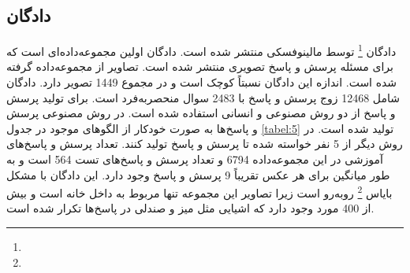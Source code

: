 \subsection{ دادگان }
	دادگان
	\footnote{}\cite{malinowski2014multi}
	توسط مالینوفسکی منتشر ‌شده ‌است. دادگان 
اولین مجموعه‌داده‌ای است که برای مسئله پرسش و پاسخ تصویری منتشر ‌شده ‌است. تصاویر از مجموعه‌داده
  \cite{silberman2012indoor}
   گرفته ‌شده ‌است.  اندازه این دادگان نسبتاً کوچک است و در مجموع 1449 تصویر دارد. دادگان
 شامل 12468 زوج پرسش و پاسخ با 2483 سوال منحصربه‌فرد است. برای تولید پرسش و پاسخ‌ از دو روش مصنوعی و انسانی استفاده ‌شده ‌است. در روش مصنوعی پرسش و پاسخ‌ها به صورت خودکار از الگوهای موجود در جدول
 \ref{tabel:5}
  تولید ‌شده ‌است. در روش دیگر از 5 نفر خواسته ‌شده‌ تا پرسش و پاسخ تولید کنند. تعداد پرسش و پاسخ‌های آموزشی در این مجموعه‌داده 6794 و تعداد پرسش و پاسخ‌های تست 564 است و به طور میانگین برای هر عکس تقریباً 9 پرسش و پاسخ وجود دارد. این دادگان با مشکل بایاس 
  \footnote{}
  روبه‌رو است زیرا تصاویر این مجموعه تنها مربوط به داخل خانه است و بیش از 400 مورد وجود دارد که اشیایی مثل میز و صندلی در پاسخ‌ها تکرار شده ‌است.
